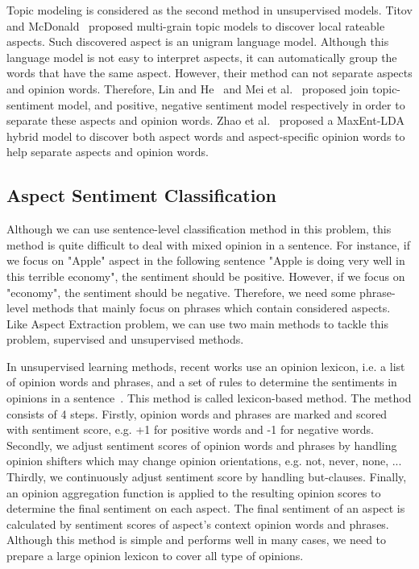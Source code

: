 \documentclass{article}
\begin{document}
Topic modeling is considered as the second method in unsupervised models.
Titov and McDonald~\cite{Titov:2008:MOR:1367497.1367513} proposed multi-grain topic models to discover local rateable aspects. 
Such discovered aspect is an unigram language model.
Although this language model is not easy to interpret aspects, it can automatically group the words that have the same aspect.
However, their method can not separate aspects and opinion words.
Therefore, Lin and He~\cite{Lin:2009:JSM:1645953.1646003} and Mei et al.~\cite{Mei:2007:TSM:1242572.1242596} proposed join topic-sentiment model, and positive, negative sentiment model respectively in order to separate these aspects and opinion words.
Zhao et al.~\cite{citeulike:9605702} proposed a MaxEnt-LDA hybrid model to discover both aspect words and aspect-specific opinion words to help separate aspects and opinion words.

\subsection{Aspect Sentiment Classification}
Although we can use sentence-level classification method in this problem, this method is quite difficult to deal with mixed opinion in a sentence.
For instance, if we focus on "Apple" aspect in the following sentence "Apple is doing very well in this terrible economy", the sentiment should be positive. 
However, if we focus on "economy", the sentiment should be negative.
Therefore, we need some phrase-level methods that mainly focus on phrases which contain considered aspects.
Like Aspect Extraction problem, we can use two main methods to tackle this problem, supervised and unsupervised methods.

In unsupervised learning methods, recent works use an opinion lexicon, i.e. a list of opinion words and phrases, and a set of rules to determine the sentiments in opinions in a sentence~\cite{Ding:2008:HLA:1341531.1341561,Hu:2004:MSC:1014052.1014073}. 
This method is called lexicon-based method.
The method consists of 4 steps.
Firstly, opinion words and phrases are marked and scored with sentiment score, e.g. +1 for positive words and -1 for negative words.
Secondly, we adjust sentiment scores of opinion words and phrases by handling opinion shifters which may change opinion orientations, e.g. not, never, none, ...
Thirdly, we continuously adjust sentiment score by handling but-clauses.
Finally, an opinion aggregation function is applied to the resulting opinion scores to determine the final sentiment on each aspect.
The final sentiment of an aspect is calculated by sentiment scores of aspect's context opinion words and phrases.
Although this method is simple and performs well in many cases, we need to prepare a large opinion lexicon to cover all type of opinions. 
\end{document}
